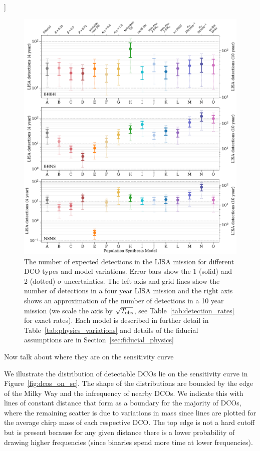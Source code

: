 \documentclass[twocolumn]{aastex63}
\newcommand{\todo}[1]{{\color{red}{[TODO: #1}]}}
\begin{document}
\todo{Add text about detection rates}

\begin{figure}[p]
    \centering
    \includegraphics[width=\textwidth]{dco_detections.pdf}
    \caption{The number of expected detections in the LISA mission for different DCO types and model variations. Error bars show the 1 (solid) and 2 (dotted) $\sigma$ uncertainties. The left axis and grid lines show the number of detections in a four year LISA mission and the right axis shows an approximation of the number of detections in a 10 year mission (we scale the axis by $\sqrt{T_{\rm obs}}$, see Table~\ref{tab:detection_rates} for exact rates). Each model is described in further detail in Table~\ref{tab:physics_variations} and details of the fiducial assumptions are in  Section~\ref{sec:fiducial_physics}}
    \label{fig:detection_rates}
\end{figure}

Now talk about where they are on the sensitivity curve

We illustrate the distribution of detectable DCOs lie on the sensitivity curve in Figure~\ref{fig:dcos_on_sc}. The shape of the distributions are bounded by the edge of the Milky Way and the infrequency of nearby DCOs. We indicate this with lines of constant distance that form as a boundary for the majority of DCOs, where the remaining scatter is due to variations in mass since lines are plotted for the average chirp mass of each respective DCO. The top edge is not a hard cutoff but is present because for any given distance there is a lower probability of drawing higher frequencies (since binaries spend more time at lower frequencies).
\end{document}
